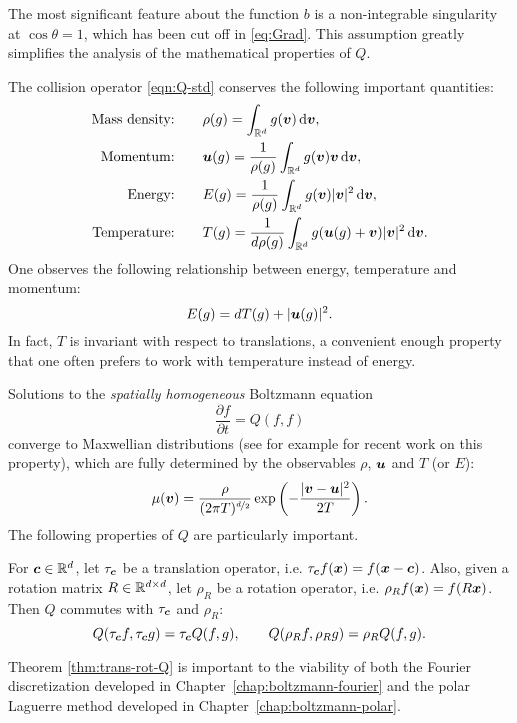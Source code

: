 The most significant feature about the function $b$ is a non-integrable singularity at $\cos\theta=1$, which
has been cut off in \eqref{eq:Grad}. This assumption greatly simplifies the analysis of the mathematical
properties of $Q$.

The collision operator \eqref{eqn:Q-std} conserves the following important quantities:
\begin{align*}
    \text{Mass density:} &\qquad\rho(g) = \int_{\mathbb{R}^d} g({\bm v})\,\mathrm{d}{\bm v},\\
    \text{Momentum:} &\qquad {\bm u}(g) = \frac{1}{\rho(g)}\int_{\mathbb{R}^d} g({\bm v}){\bm v}\,\mathrm{d}{\bm v},\\
    \text{Energy:} &\qquad E(g) = \frac{1}{\rho(g)}\int_{\mathbb{R}^d} g({\bm v})|{\bm v}|^2\,\mathrm{d}{\bm v},\\
    \text{Temperature:} &\qquad T(g) = \frac{1}{d\rho(g)}\int_{\mathbb{R}^d} g({\bm u}(g)+{\bm v})|{\bm v}|^2\,\mathrm{d}{\bm v}.
\end{align*}
One observes the following relationship between energy, temperature and momentum:
\[
    E(g) = dT(g) + |{\bm u}(g)|^2.
\]
In fact, $T$ is invariant with respect to translations, a convenient enough property that one often prefers to
work with temperature instead of energy.

Solutions to the {\em spatially homogeneous} Boltzmann equation 
\[
    \frac{\partial f}{\partial t} = Q(f,f)
\]
converge to Maxwellian distributions (see for example \cite{Gressman11} for recent work on this property),
which are fully determined by the observables $\rho$, ${\bm u}$ and $T$ (or $E$):
\begin{equation} \label{eqn:maxwellian}
    \mu({\bm v}) = \frac{\rho}{(2\pi T)^{\nicefrac{d}{2}}} \exp\left( -\frac{|{\bm v}-{\bm u}|^2}{2T} \right).
\end{equation}
The following properties of $Q$ are particularly important.
\begin{theorem} \label{thm:trans-rot-Q}
For ${\bm c}\in\mathbb{R}^d$, let $\tau_{\bm c}$ be a translation operator, i.e. $\tau_{\bm c} f({\bm x}) = f({\bm x}-{\bm c})$. Also, given a
rotation matrix $R\in\mathbb{R}^{d\times d}$, let $\rho_R$ be a rotation operator, i.e. $\rho_R f({\bm x}) = f(R{\bm x})$.
Then $Q$ commutes with $\tau_{\bm c}$ and $\rho_R$:
\[
    Q(\tau_{\bm c} f, \tau_{\bm c} g) = \tau_{\bm c} Q(f,g), \qquad
    Q(\rho_R f, \rho_R g) = \rho_R Q(f,g).
\]
\end{theorem}
Theorem \ref{thm:trans-rot-Q} is important to the viability of both the Fourier discretization developed in
Chapter~\ref{chap:boltzmann-fourier} and the polar Laguerre method developed in
Chapter~\ref{chap:boltzmann-polar}.


